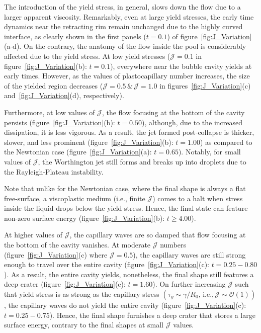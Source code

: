 \documentclass[final]{jfm}
\begin{document}
The introduction of the yield stress, in general, slows down the flow due to a larger apparent viscosity. Remarkably, even at large yield stresses, the early time dynamics near the retracting rim remain unchanged due to the highly curved interface, as clearly shown in the first panels ($t = 0.1$) of figure~\ref{fig:J_Variation} (a-d).  
On the contrary, the anatomy of the flow inside the pool is considerably affected due to the yield stress. At low yield stresses ($\mathcal{J} = 0.1$ in figure~\ref{fig:J_Variation}(b): $t = 0.1$), everywhere near the bubble cavity yields at early times. However, as the values of plastocapillary number increases, the size of the yielded region decreases ($\mathcal{J} = 0.5\, \&\,\mathcal{J} = 1.0$ in figures~\ref{fig:J_Variation}(c) and~\ref{fig:J_Variation}(d), respectively). 

Furthermore, at low values of $\mathcal{J}$, the flow focusing at the bottom of the cavity persists (figure~\ref{fig:J_Variation}(b): $t = 0.50$), although, due to the increased dissipation, it is less vigorous. As a result, the jet formed post-collapse is thicker, slower, and less prominent (figure~\ref{fig:J_Variation}(b): $t = 1.00$) as compared to the Newtonian case (figure~\ref{fig:J_Variation}(a): $t = 0.65$). Notably, for small values of $\mathcal{J}$, the Worthington jet still forms and breaks up into droplets due to the Rayleigh-Plateau instability. 

Note that unlike for the Newtonian case, where the final shape is always a flat free-surface, a viscoplastic medium (i.e., finite $\mathcal{J}$) comes to a halt when stress inside the liquid drops below the yield stress. Hence, the final state can feature non-zero surface energy (figure~\ref{fig:J_Variation}(b): $t \ge 4.00$). 

At higher values of $\mathcal{J}$, the capillary waves are so damped that flow focusing at the bottom of the cavity vanishes. At moderate $\mathcal{J}$ numbers (figure~\ref{fig:J_Variation}(c) where $\mathcal{J} = 0.5$), the capillary waves are still strong enough to travel over the entire cavity (figure~\ref{fig:J_Variation}(c): $t = 0.25 - 0.80$). As a result, the entire cavity yields, nonetheless,  the final shape still features a deep crater (figure~\ref{fig:J_Variation}(c): $t = 1.60$). 
On further increasing $\mathcal{J}$ such that yield stress is as strong as the capillary stress $\left(\tau_y \sim \gamma/R_0\text{, i.e.,}\,\mathcal{J} \sim \mathcal{O}\left(1\right)\right)$, the capillary waves do not yield the entire cavity (figure~\ref{fig:J_Variation}(c): $t = 0.25 - 0.75$). Hence, the final shape furnishes a deep crater that stores a large surface energy, contrary to the final shapes at small $\mathcal{J}$  values.
\end{document}
